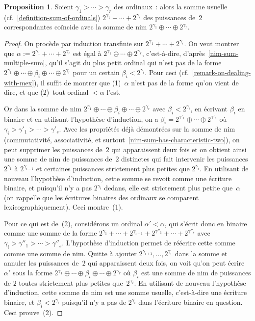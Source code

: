 \documentclass[12pt,a4paper]{article}
\theoremstyle{definition}
\newtheorem{prop}[comcnt]{Proposition}
\begin{document}
\begin{prop}\label{nim-sum-of-powers-of-two-is-ordinary-sum}
Soient $\gamma_1 > \cdots > \gamma_r$ des ordinaux : alors la somme
usuelle (cf. \ref{definition-sum-of-ordinals}) $2^{\gamma_1} + \cdots
+ 2^{\gamma_r}$ des puissances de $2$ correspondantes coïncide avec la
somme de nim $2^{\gamma_1} \oplus \cdots \oplus 2^{\gamma_r}$.
\end{prop}
\begin{proof}
On procède par induction transfinie sur $2^{\gamma_1} + \cdots +
2^{\gamma_r}$.  On veut montrer que $\alpha := 2^{\gamma_1} + \cdots +
2^{\gamma_r}$ est égal à $2^{\gamma_1} \oplus \cdots \oplus
2^{\gamma_r}$, c'est-à-dire, d'après \ref{nim-sum-multiple-sum}, qu'il
s'agit du plus petit ordinal qui n'est pas de la forme $2^{\gamma_1}
\oplus \cdots \oplus \beta_i \oplus \cdots \oplus 2^{\gamma_r}$ pour
un certain $\beta_i < 2^{\gamma_i}$.  Pour ceci
(cf. \ref{remark-on-dealing-with-mex}), il suffit de montrer que
(1) $\alpha$ n'est pas de la forme qu'on vient de dire, et que
(2) tout ordinal $<\alpha$ l'est.

Or dans la somme de nim $2^{\gamma_1} \oplus \cdots \oplus \beta_i
\oplus \cdots \oplus 2^{\gamma_r}$ avec $\beta_i < 2^{\gamma_i}$, en
écrivant $\beta_i$ en binaire et en utilisant l'hypothèse d'induction,
on a $\beta_i = 2^{\gamma'_1} \oplus \cdots \oplus 2^{\gamma'_s}$ où
$\gamma_i > \gamma'_1 > \cdots > \gamma'_s$.  Avec les propriétés déjà
démontrées sur la somme de nim (commutativité, associativité, et
surtout \ref{nim-sum-has-characteristic-two}), on peut supprimer les
puissances de $2$ qui apparaissent deux fois et on obtient ainsi une
somme de nim de puissances de $2$ distinctes qui fait intervenir les
puissances $2^{\gamma_1}$ à $2^{\gamma_{i-1}}$ et certaines puissances
strictement plus petites que $2^{\gamma_i}$.  En utilisant de nouveau
l'hypothèse d'induction, cette somme se revoit comme une écriture
binaire, et puisqu'il n'y a pas $2^{\gamma_i}$ dedans, elle est
strictement plus petite que $\alpha$ (on rappelle que les écritures
binaires des ordinaux se comparent lexicographiquement).  Ceci
montre (1).

Pour ce qui est de (2), considérons un ordinal $\alpha'<\alpha$, qui
s'écrit donc en binaire comme une somme de la forme $2^{\gamma_1} +
\cdots + 2^{\gamma_{i-1}} + 2^{\gamma''_1} + \cdots + 2^{\gamma''_s}$
avec $\gamma_i > \gamma''_1 > \cdots > \gamma''_s$.  L'hypothèse
d'induction permet de réécrire cette somme comme une somme de nim.
Quitte à ajouter $2^{\gamma_{i+1}},\ldots,2^{\gamma_r}$ dans la somme
et annuler les puissances de $2$ qui apparaissent deux fois, on voit
qu'on peut écrire $\alpha'$ sous la forme $2^{\gamma_1} \oplus \cdots
\oplus \beta_i \oplus \cdots \oplus 2^{\gamma_r}$ où $\beta_i$ est une
somme de nim de puissances de $2$ toutes strictement plus petites
que $2^{\gamma_i}$.  En utilisant de nouveau l'hypothèse d'induction,
cette somme de nim est une somme usuelle, c'est-à-dire une écriture
binaire, et $\beta_i < 2^{\gamma_i}$ puisqu'il n'y a pas de
$2^{\gamma_i}$ dans l'écriture binaire en question.  Ceci prouve (2).
\end{proof}
\end{document}
